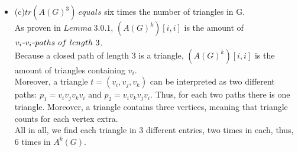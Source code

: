 \documentclass[a4paper]{article}
\newcommand{\unaryminus}{\scalebox{0.5}[1.0]{\( - \)}}
\begin{document}
\begin{solution}{31}
\begin{itemize}
				\item (c)$tr(A(G)^3) ~equals$ six times the number of triangles in G.\\
					As proven in $Lemma ~ 3.0.1$, $(A(G)^k)[i,i]$ is the amount of $v_i\unaryminus v_i \unaryminus paths ~of ~length ~3$.\\
					Because a closed path of length $3$ is a triangle, $(A(G)^k)[i,i]$ is the amount of triangles containing $v_i$.\\
					Moreover, a triangle $t=(v_i,v_j,v_k)$ can be interpreted as two different paths: $p_1=v_iv_jv_kv_i$ and $p_2=v_iv_kv_jv_i$. Thus, for each two paths there is one triangle. Moreover, a triangle contains three vertices, meaning that triangle counts for each vertex extra.\\
					All in all, we find each triangle in 3 different entries, two times in each, thus, 6 times in $A^k(G)$.
			\end{itemize}
		\end{solution}
	\newpage
\end{document}
